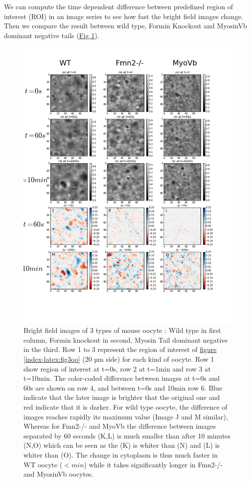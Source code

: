 \documentclass[A4paperpaper,11pt,english]{sphinxmanual}
\begin{document}
We can compute the time dependent difference between predefined region of interest (ROI) in an image
series to see how fast the bright field images change. Then we compare
the result between wild type, Formin Knockout and MyosinVb dominant negative tails (\hyperref[index-latex:decay-all]{Fig  \ref*{index-latex:decay-all}}).
\begin{figure}[htbp]
\centering
\capstart

\includegraphics[width=0.800\linewidth]{decay-all.png}
\caption{Bright field images of 3 types of mouse oocyte : Wild type in first column,
Formin knockout in second, Myosin Tail dominant negative in the third. Row 1
to 3 represent the region of interest of \hyperref[index-latex:fig3oo]{figure  \ref*{index-latex:fig3oo}} (20 µm side)
for each kind of oocyte. Row 1 show region of interest at t=0s, row 2 at
t=1min and row 3 at t=10min. The color-coded difference between images at
t=0s and 60s are shown on row 4, and between t=0s and 10min row 6. Blue
indicate that the later image is brighter that the original one and red
indicate that it is darker. For wild type oocyte, the difference of images
reaches rapidly its maximum value (Image J and M similar), Whereas for
Fmn2-/- and MyoVb the difference between images separated by 60 seconds
(K,L) is much smaller than after 10 minutes (N,O) which can be seen as the
(K) is whiter than (N) and (L) is whiter than (O). The change in cytoplasm
is thus much faster in WT oocyte (\(< min\)) while it takes
significantly longer in Fmn2-/- and MyosinVb oocytes.}\label{index-latex:decay-all}\end{figure}
\end{document}
